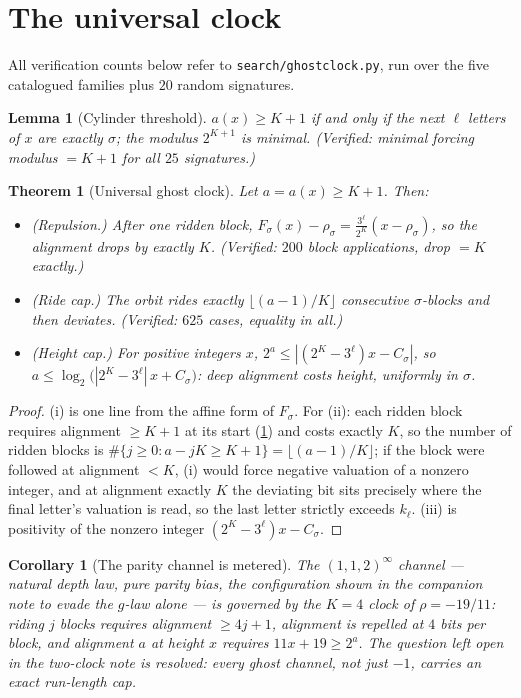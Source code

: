 \documentclass[11pt]{article}
\newtheorem{theorem}{Theorem}
\newtheorem{lemma}{Lemma}
\newtheorem{corollary}{Corollary}
\begin{document}
\section{The universal clock}

All verification counts below refer to \texttt{search/ghostclock.py},
run over the five catalogued families plus $20$ random signatures.

\begin{lemma}[Cylinder threshold]\label{lem:cyl}
$a(x)\ge K+1$ if and only if the next $\ell$ letters of $x$ are
exactly $\sigma$; the modulus $2^{K+1}$ is minimal. (Verified: minimal
forcing modulus $=K+1$ for all $25$ signatures.)
\end{lemma}

\begin{theorem}[Universal ghost clock]\label{thm:clock}
Let $a=a(x)\ge K+1$. Then:
\begin{itemize}
\item[(i)] (\emph{Repulsion.}) After one ridden block,
$F_\sigma(x)-\rho_\sigma=\tfrac{3^\ell}{2^K}(x-\rho_\sigma)$, so the
alignment drops by exactly $K$. (Verified: $200$ block applications,
drop $=K$ exactly.)
\item[(ii)] (\emph{Ride cap.}) The orbit rides exactly
$\lfloor(a-1)/K\rfloor$ consecutive $\sigma$-blocks and then deviates.
(Verified: $625$ cases, equality in all.)
\item[(iii)] (\emph{Height cap.}) For positive integers $x$,
$2^a\le|(2^K-3^\ell)x-C_\sigma|$, so
$a\le\log_2\bigl(|2^K-3^\ell|\,x+C_\sigma\bigr)$: deep alignment costs
height, uniformly in $\sigma$.
\end{itemize}
\end{theorem}

\begin{proof}
(i) is one line from the affine form of $F_\sigma$. For (ii): each
ridden block requires alignment $\ge K+1$ at its start
(\cref{lem:cyl}) and costs exactly $K$, so the number of ridden blocks
is $\#\{j\ge0:a-jK\ge K+1\}=\lfloor(a-1)/K\rfloor$; if the block were
followed at alignment $<K$, (i) would force negative valuation of a
nonzero integer, and at alignment exactly $K$ the deviating bit sits
precisely where the final letter's valuation is read, so the last
letter strictly exceeds $k_\ell$. (iii) is positivity of the nonzero
integer $(2^K-3^\ell)x-C_\sigma$.
\end{proof}

\begin{corollary}[The parity channel is metered]\label{cor:parity}
The $(1,1,2)^\infty$ channel --- natural depth law, pure parity bias,
the configuration shown in the companion note to evade the $g$-law
alone --- is governed by the $K=4$ clock of $\rho=-19/11$: riding $j$
blocks requires alignment $\ge4j+1$, alignment is repelled at $4$ bits
per block, and alignment $a$ at height $x$ requires
$11x+19\ge2^a$. The question left open in the two-clock note is
resolved: \emph{every} ghost channel, not just $-1$, carries an exact
run-length cap.
\end{corollary}
\end{document}
